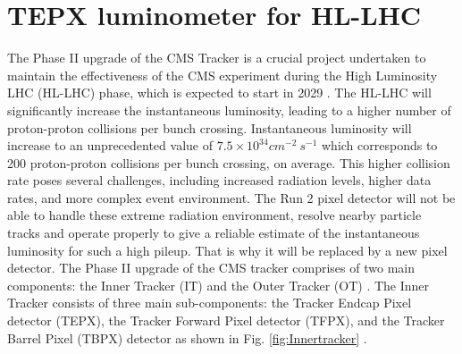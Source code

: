 \chapter{TEPX luminometer for HL-LHC}  %
\label{TEPX luminometer for HL-LHC}
  
\ifpdf
    \graphicspath{{Chapter7/Figs/Raster/}{Chapter7/Figs/PDF/}{Chapter7/Figs/}}
\else
    \graphicspath{{Chapter7/Figs/Vector/}{Chapter7/Figs/}}
\fi

The Phase II upgrade of the CMS Tracker is a crucial project undertaken to maintain the effectiveness of the CMS experiment during the High Luminosity LHC (HL-LHC) phase, which is expected to start in 2029 \cite{CERN2022}. The HL-LHC will significantly increase the instantaneous luminosity, leading to a higher number of proton-proton collisions per bunch crossing. Instantaneous luminosity will increase to an unprecedented value of $7.5 \times 10^{34} cm^{-2} \: s^{-1}$ which corresponds to 200 proton-proton collisions per bunch crossing, on average. This higher collision rate poses several challenges, including increased radiation levels, higher data rates, and more complex event environment. The Run 2 pixel detector will not be able to handle these extreme radiation environment, resolve nearby particle tracks and operate properly to give a reliable estimate of the instantaneous luminosity for such a high pileup. That is why it will be replaced by a new pixel detector. The Phase II upgrade of the CMS tracker comprises of two main components: the Inner Tracker (IT) and the Outer Tracker (OT) \cite{RoyChowdhury:2729279}. The Inner Tracker consists of three main sub-components: the Tracker Endcap Pixel detector (TEPX), the Tracker Forward Pixel detector (TFPX), and the Tracker Barrel Pixel (TBPX) detector as shown in Fig. \ref{fig:Innertracker} \cite{CERN-LHCC-2017-009}.  %

